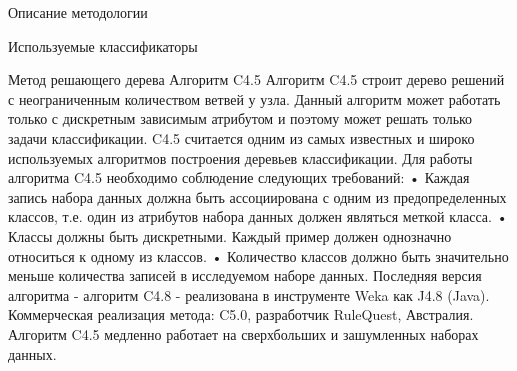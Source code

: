 \begin{section}{Описание методологии}
\begin{subsection}{Используемые классификаторы}
\begin{subsubsection}{Метод решающего дерева}
Алгоритм C4.5
Алгоритм C4.5 строит дерево решений с неограниченным количеством ветвей у узла. Данный алгоритм может работать только с дискретным зависимым атрибутом и поэтому может решать только задачи классификации. C4.5 считается одним из самых известных и широко используемых алгоритмов построения деревьев классификации.
Для работы алгоритма C4.5 необходимо соблюдение следующих требований:
•	Каждая запись набора данных должна быть ассоциирована с одним из предопределенных классов, т.е. один из атрибутов набора данных должен являться меткой класса.
•	Классы должны быть дискретными. Каждый пример должен однозначно относиться к одному из классов.
•	Количество классов должно быть значительно меньше количества записей в исследуемом наборе данных.
Последняя версия алгоритма - алгоритм C4.8 - реализована в инструменте Weka как J4.8 (Java). Коммерческая реализация метода: C5.0, разработчик RuleQuest, Австралия.
Алгоритм C4.5 медленно работает на сверхбольших и зашумленных наборах данных.

    \end{subsubsection}


\end{subsection}
\end{section}
